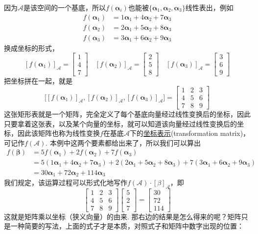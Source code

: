 \documentclass[main.tex]{subfiles}
\begin{document}
因为\(\mathcal A\)是该空间的一个基底，所以\(f(\bm\alpha_i)\)也能被\(\{\bm\alpha_1,\bm\alpha_2,\bm\alpha_3\}\)线性表出，例如
\begin{align*}
    f(\bm\alpha_1) &= 1\bm\alpha_1+4\bm\alpha_2+7\bm\alpha_3 \\
    f(\bm\alpha_2) &= 2\bm\alpha_1+5\bm\alpha_2+8\bm\alpha_3 \\
    f(\bm\alpha_3) &= 3\bm\alpha_1+6\bm\alpha_2+9\bm\alpha_3
\end{align*}
换成坐标的形式，
\[[f(\bm\alpha_1)]_\mathcal{A} = \begin{bmatrix} 1 \\ 4 \\ 7 \end{bmatrix} \quad [f(\bm\alpha_2)]_\mathcal{A} = \begin{bmatrix} 2 \\ 5 \\ 8 \end{bmatrix} \quad [f(\bm\alpha_3)]_\mathcal{A} = \begin{bmatrix} 3 \\ 6 \\ 9 \end{bmatrix}\]
把坐标拼在一起，就是
\[\big[
    [f(\bm\alpha_1)]_\mathcal{A} , [f(\bm\alpha_2)]_\mathcal{A} , [f(\bm\alpha_3)]_\mathcal{A} 
    \big] = 
    \begin{bmatrix} 1 & 2 & 3 \\ 4 & 5 & 6 \\ 7 & 8 & 9 \end{bmatrix}
\]
这张矩形表就是一个矩阵，完全定义了每个基底向量经过线性变换后的坐标，因此只要拿着这张表，以及某个向量的坐标，就可以知道该向量经过线性变换后的坐标，因此该矩阵也称为线性变换\(f\)在基底\(\mathcal A\)下的\uline{坐标表示}(transformation matrix)，可记作\(f(\mathcal{A})\). 本例中这两个要素都给出来了，所以我们可以算出
\[
    \begin{aligned}
        f(\bm\beta) & = 5f(\bm\alpha_1)+2f(\bm\alpha_2)+7f(\bm\alpha_3) \\
        &= 5(1\bm\alpha_1+4\bm\alpha_2+7\bm\alpha_3) + 2(2\bm\alpha_1+5\bm\alpha_2+8\bm\alpha_3) + 7(3\bm\alpha_1+6\bm\alpha_2+9\bm\alpha_3) \\
        &= 30\bm\alpha_1 + 72\bm\alpha_2 + 114\bm\alpha_3
    \end{aligned}
\]
我们规定，该运算过程可以形式化地写作\(f(\mathcal{A})\cdot[\beta]_\mathcal{A}\)，即
\[\begin{bmatrix} 1 & 2 & 3 \\ 4 & 5 & 6 \\ 7 & 8 & 9 \end{bmatrix} \begin{bmatrix} 5 \\ 2 \\ 7 \end{bmatrix} = \begin{bmatrix} 30 \\ 72 \\ 114 \end{bmatrix}\]
这就是矩阵乘以坐标（狭义向量）的由来. 那右边的结果是怎么得来的呢？矩阵只是一种简要的写法，上面的式子才是本质，对照式子和矩阵中数字出现的位置：
\end{document}
